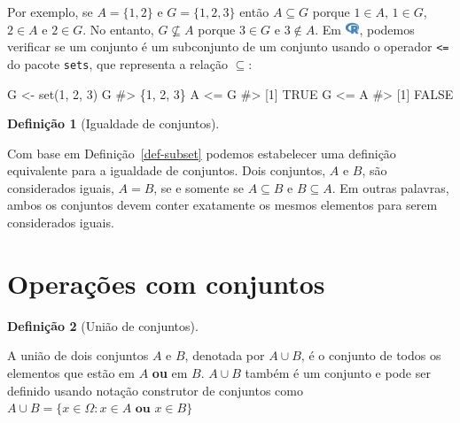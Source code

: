 \documentclass[
  letterpaper,
]{book}
\newenvironment{Shaded}{\begin{snugshade}}{\end{snugshade}}
\newcommand{\CommentTok}[1]{\textcolor[rgb]{0.37,0.37,0.37}{#1}}
\newcommand{\DecValTok}[1]{\textcolor[rgb]{0.68,0.00,0.00}{#1}}
\newcommand{\FunctionTok}[1]{\textcolor[rgb]{0.28,0.35,0.67}{#1}}
\newcommand{\NormalTok}[1]{\textcolor[rgb]{0.00,0.23,0.31}{#1}}
\newcommand{\OtherTok}[1]{\textcolor[rgb]{0.00,0.23,0.31}{#1}}
\newcommand{\SpecialCharTok}[1]{\textcolor[rgb]{0.37,0.37,0.37}{#1}}
\theoremstyle{definition}
\newtheorem{definition}{Definição}[chapter]
\theoremstyle{plain}
\theoremstyle{remark}
\begin{document}
Por exemplo, se \(A = \{ 1 , 2 \}\) e \(G = \{ 1, 2, 3\}\) então
\(A \subseteq G\) porque \(1 \in A\), \(1 \in G\), \(2 \in A\) e
\(2 \in G\). No entanto, \(G \nsubseteq A\) porque \(3 \in G\) e
\(3 \notin A\). Em
\includegraphics[width=1.13em,height=1em]{naive_set_theory_files/figure-pdf/fa-icon-9b00320707d42527dde67262afb33ded.pdf},
podemos verificar se um conjunto é um subconjunto de um conjunto usando
o operador \texttt{\textless{}=} do pacote \texttt{sets}, que representa
a relação \(\subseteq\):

\begin{Shaded}
\begin{Highlighting}[]
\NormalTok{G }\OtherTok{\textless{}{-}} \FunctionTok{set}\NormalTok{(}\DecValTok{1}\NormalTok{, }\DecValTok{2}\NormalTok{, }\DecValTok{3}\NormalTok{)}
\NormalTok{G}
\CommentTok{\#\textgreater{} \{1, 2, 3\}}
\NormalTok{A }\SpecialCharTok{\textless{}=}\NormalTok{ G}
\CommentTok{\#\textgreater{} [1] TRUE}
\NormalTok{G }\SpecialCharTok{\textless{}=}\NormalTok{ A}
\CommentTok{\#\textgreater{} [1] FALSE}
\end{Highlighting}
\end{Shaded}

\begin{definition}[Igualdade de
conjuntos]\protect\hypertarget{def-set-equality}{}\label{def-set-equality}

Com base em Definição~\ref{def-subset} podemos estabelecer uma definição
equivalente para a igualdade de conjuntos. Dois conjuntos, \(A\) e
\(B\), são considerados iguais, \(A = B\), se e somente se
\(A \subseteq B\) e \(B \subseteq A\). Em outras palavras, ambos os
conjuntos devem conter exatamente os mesmos elementos para serem
considerados iguais.

\end{definition}

\section{Operações com conjuntos}\label{operauxe7uxf5es-com-conjuntos}

\begin{definition}[União de
conjuntos]\protect\hypertarget{def-union}{}\label{def-union}

A união de dois conjuntos \(A\) e \(B\), denotada por \(A \cup B\), é o
conjunto de todos os elementos que estão em \(A\) \textbf{ou} em \(B\).
\(A \cup B\) também é um conjunto e pode ser definido usando notação
construtor de conjuntos como
\(A \cup B = \{x \in \Omega : x \in A \textbf{ ou } x \in B \}\)

\end{definition}
\end{document}
